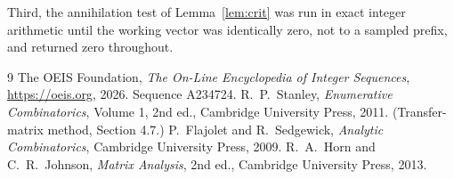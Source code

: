 \documentclass[11pt,a4paper]{article}
\theoremstyle{plain}
\theoremstyle{definition}
\begin{document}
Third, the annihilation test of Lemma~\ref{lem:crit} was run in exact integer arithmetic
until the working vector was identically zero, not to a sampled prefix, and returned zero
throughout.

\begin{thebibliography}{9}
 The OEIS Foundation, \emph{The On-Line Encyclopedia of Integer
Sequences}, \url{https://oeis.org}, 2026. Sequence A234724.
 R.~P.~Stanley, \emph{Enumerative Combinatorics}, Volume 1, 2nd ed.,
Cambridge University Press, 2011. (Transfer-matrix method, Section 4.7.)
 P.~Flajolet and R.~Sedgewick, \emph{Analytic Combinatorics}, Cambridge
University Press, 2009.
 R.~A.~Horn and C.~R.~Johnson, \emph{Matrix Analysis}, 2nd ed., Cambridge
University Press, 2013.
\end{thebibliography}
\end{document}
